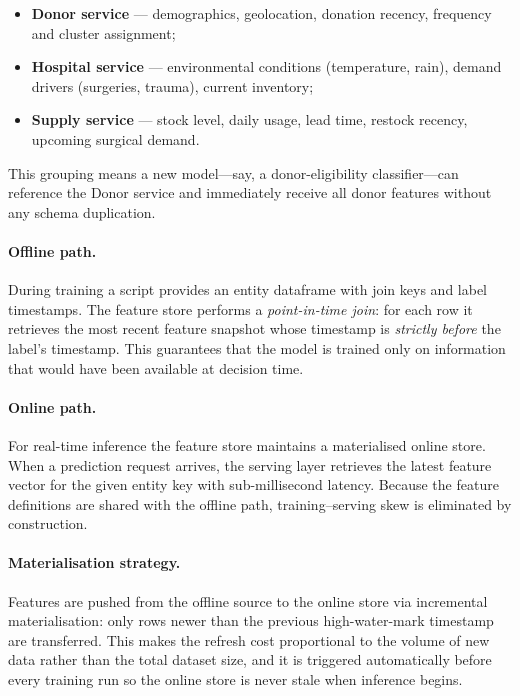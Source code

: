 \begin{itemize}
\item \textbf{Donor service} — demographics, geolocation, donation
      recency, frequency and cluster assignment;
\item \textbf{Hospital service} — environmental conditions (temperature,
      rain), demand drivers (surgeries, trauma), current inventory;
\item \textbf{Supply service} — stock level, daily usage, lead time,
      restock recency, upcoming surgical demand.
\end{itemize}

This grouping means a new model—say, a donor-eligibility classifier—can
reference the Donor service and immediately receive all donor features
without any schema duplication.

\paragraph{Offline path.}

During training a script provides an entity dataframe with join keys and
label timestamps.  The feature store performs a \emph{point-in-time join}:
for each row it retrieves the most recent feature snapshot whose timestamp
is \emph{strictly before} the label's timestamp.  This guarantees that the
model is trained only on information that would have been available at
decision time.

\paragraph{Online path.}

For real-time inference the feature store maintains a materialised online
store.  When a prediction request arrives, the serving layer retrieves the
latest feature vector for the given entity key with sub-millisecond
latency.  Because the feature definitions are shared with the offline
path, training--serving skew is eliminated by construction.

\paragraph{Materialisation strategy.}

Features are pushed from the offline source to the online store via
incremental materialisation: only rows newer than the previous
high-water-mark timestamp are transferred.  This makes the refresh cost
proportional to the volume of new data rather than the total dataset size,
and it is triggered automatically before every training run so the online
store is never stale when inference begins.



